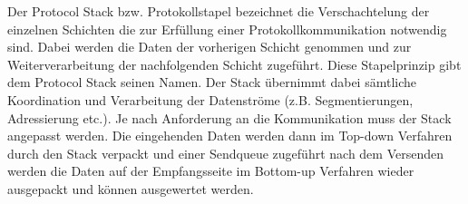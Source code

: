 Der Protocol Stack bzw. Protokollstapel bezeichnet die Verschachtelung der
einzelnen Schichten die zur Erf{\"u}llung einer Protokollkommunikation
notwendig sind. Dabei werden die Daten der vorherigen Schicht genommen und zur
Weiterverarbeitung der nachfolgenden Schicht zugef{\"u}hrt. Diese Stapelprinzip
gibt dem Protocol Stack seinen Namen. Der Stack {\"u}bernimmt dabei
s{\"a}mtliche Koordination und Verarbeitung der Datenstr{\"o}me (z.B.
Segmentierungen, Adressierung etc.).
Je nach Anforderung an die Kommunikation muss der Stack angepasst werden. Die
eingehenden Daten werden dann im Top-down Verfahren durch den Stack verpackt
und einer Sendqueue zugef{\"u}hrt nach dem Versenden werden die Daten auf der
Empfangsseite im Bottom-up Verfahren wieder ausgepackt und k{\"o}nnen
ausgewertet werden.
